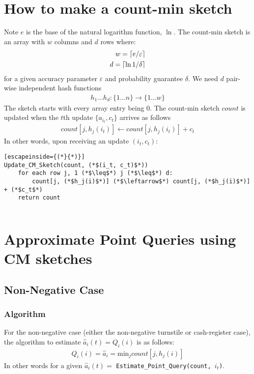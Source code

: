 \documentclass[11pt]{article}
\newcommand{\comment}[1]{}
\newcommand{\sq}{\mathit{Q}_i}
\DeclarePairedDelimiter\ceil{\lceil}{\rceil}
\newcommand{\ra}{\rightarrow}
\begin{document}
\section{How to make a count-min sketch}
Note $e$ is the base of the natural logarithm function, $\ln$. The count-min
sketch is an array with $w$ columns and $d$ rows where:
\begin{align}
    w = \ceil{e/\varepsilon}\\
    d = \ceil{\ln{1/\delta}}
\end{align}
for a given accuracy parameter $\varepsilon$ and probability guarantee $\delta$.
We need $d$ pair-wise independent hash functions
\begin{align}
    h_1 \dots h_d : \{1 \dots n\} \ra \{1 \dots w\} 
\end{align}
The sketch starts with every array entry being 0. The count-min sketch $count$
is updated when the $t$th update $\{a_{i_t}, c_t\}$ arrives as follows
\begin{align}
    count[j, h_j(i_t)] \leftarrow count[j, h_j(i_t)] + c_t     
\end{align}
In other words, upon receiving an update $(i_t, c_t)$:
\begin{lstlisting}[escapeinside={(*}{*)}]
Update_CM_Sketch(count, (*$(i_t, c_t)$*)) 
    for each row j, 1 (*$\leq$*) j (*$\leq$*) d:
        count[j, (*$h_j(i)$*)] (*$\leftarrow$*) count[j, (*$h_j(i)$*)] + (*$c_t$*)
    return count 
    
\end{lstlisting}

\comment{
\begin{enumerate}
    \item for each row $1 \leq j \leq d$
    \begin{enumerate}
        \item add $c_t$ to the $h_j(i)$th column.
    \end{enumerate}
\end{enumerate}
}
\section{Approximate Point Queries using CM sketches}

\subsection{Non-Negative Case}
\subsubsection{Algorithm}
For the non-negative case (either the non-negative turnstile or cash-register case),
the algorithm to estimate $\hat{a}_i(t) = \sq(i)$ is as follows: 
\begin{align}
    \sq(i) = \hat{a}_i = \text{min}_j count[j, h_j(i)]
\end{align}
In other words for a given $\hat a_i(t) =$ \texttt{Estimate\_Point\_Query(count, $i_t$)}.
\end{document}
